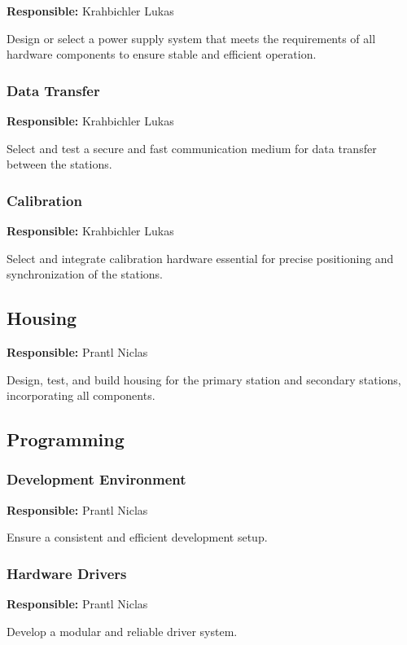 \textbf{Responsible:} Krahbichler Lukas

Design or select a power supply system that meets the requirements of all hardware components to ensure stable and efficient operation.

\subsubsection{Data Transfer}

\textbf{Responsible:} Krahbichler Lukas

Select and test a secure and fast communication medium for data transfer between the stations.

\subsubsection{Calibration}

\textbf{Responsible:} Krahbichler Lukas

Select and integrate calibration hardware essential for precise positioning and synchronization of the stations.

\subsection{Housing}

\textbf{Responsible:} Prantl Niclas

Design, test, and build housing for the primary station and secondary stations, incorporating all components.

\subsection{Programming}

\subsubsection{Development Environment}

\textbf{Responsible:} Prantl Niclas

Ensure a consistent and efficient development setup.

\subsubsection{Hardware Drivers}

\textbf{Responsible:} Prantl Niclas

Develop a modular and reliable driver system.

